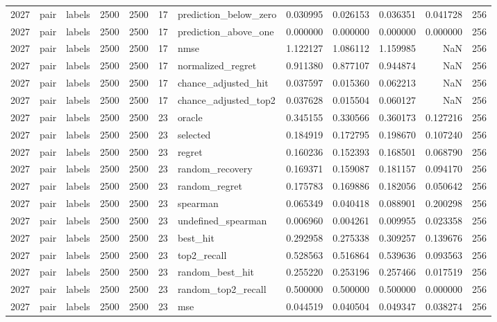 \begin{tabular}{rllrrrlrrrrr}
2027 & pair & labels & 2500 & 2500 & 17 & prediction_below_zero & 0.030995 & 0.026153 & 0.036351 & 0.041728 & 256 \\
2027 & pair & labels & 2500 & 2500 & 17 & prediction_above_one & 0.000000 & 0.000000 & 0.000000 & 0.000000 & 256 \\
2027 & pair & labels & 2500 & 2500 & 17 & nmse & 1.122127 & 1.086112 & 1.159985 & NaN & 256 \\
2027 & pair & labels & 2500 & 2500 & 17 & normalized_regret & 0.911380 & 0.877107 & 0.944874 & NaN & 256 \\
2027 & pair & labels & 2500 & 2500 & 17 & chance_adjusted_hit & 0.037597 & 0.015360 & 0.062213 & NaN & 256 \\
2027 & pair & labels & 2500 & 2500 & 17 & chance_adjusted_top2 & 0.037628 & 0.015504 & 0.060127 & NaN & 256 \\
2027 & pair & labels & 2500 & 2500 & 23 & oracle & 0.345155 & 0.330566 & 0.360173 & 0.127216 & 256 \\
2027 & pair & labels & 2500 & 2500 & 23 & selected & 0.184919 & 0.172795 & 0.198670 & 0.107240 & 256 \\
2027 & pair & labels & 2500 & 2500 & 23 & regret & 0.160236 & 0.152393 & 0.168501 & 0.068790 & 256 \\
2027 & pair & labels & 2500 & 2500 & 23 & random_recovery & 0.169371 & 0.159087 & 0.181157 & 0.094170 & 256 \\
2027 & pair & labels & 2500 & 2500 & 23 & random_regret & 0.175783 & 0.169886 & 0.182056 & 0.050642 & 256 \\
2027 & pair & labels & 2500 & 2500 & 23 & spearman & 0.065349 & 0.040418 & 0.088901 & 0.200298 & 256 \\
2027 & pair & labels & 2500 & 2500 & 23 & undefined_spearman & 0.006960 & 0.004261 & 0.009955 & 0.023358 & 256 \\
2027 & pair & labels & 2500 & 2500 & 23 & best_hit & 0.292958 & 0.275338 & 0.309257 & 0.139676 & 256 \\
2027 & pair & labels & 2500 & 2500 & 23 & top2_recall & 0.528563 & 0.516864 & 0.539636 & 0.093563 & 256 \\
2027 & pair & labels & 2500 & 2500 & 23 & random_best_hit & 0.255220 & 0.253196 & 0.257466 & 0.017519 & 256 \\
2027 & pair & labels & 2500 & 2500 & 23 & random_top2_recall & 0.500000 & 0.500000 & 0.500000 & 0.000000 & 256 \\
2027 & pair & labels & 2500 & 2500 & 23 & mse & 0.044519 & 0.040504 & 0.049347 & 0.038274 & 256 \\

\end{tabular}
